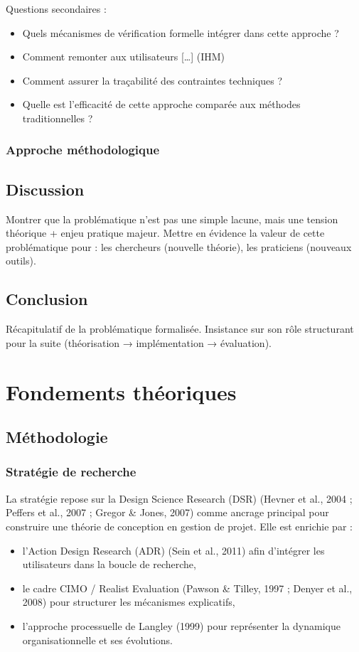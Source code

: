 \documentclass[a4paper,12pt]{article}
\begin{document}
Questions secondaires :
\begin{itemize}
\item Quels mécanismes de vérification formelle intégrer dans cette approche ?
\item Comment remonter aux utilisateurs [\ldots{}] (IHM)
\item Comment assurer la traçabilité des contraintes techniques ?
\item Quelle est l'efficacité de cette approche comparée aux méthodes traditionnelles ?
\end{itemize}
\subsubsection{Approche méthodologique}
\label{sec:org1551645}
\subsection{Discussion}
\label{sec:org03212c4}
Montrer que la problématique n’est pas une simple lacune, mais une tension théorique + enjeu pratique majeur.
Mettre en évidence la valeur de cette problématique pour :
les chercheurs (nouvelle théorie),
les praticiens (nouveaux outils).
\subsection{Conclusion}
\label{sec:org14a85c7}
Récapitulatif de la problématique formalisée.
Insistance sur son rôle structurant pour la suite (théorisation → implémentation → évaluation).
\clearpage
\section{Fondements théoriques}
\label{sec:org3c579f3}
\subsection{Méthodologie}
\label{sec:org51f4640}
\subsubsection{Stratégie de recherche}
\label{sec:org715d37f}
La stratégie repose sur la Design Science Research (DSR) (Hevner et al., 2004 ; Peffers et al., 2007 ; Gregor \& Jones, 2007) comme ancrage principal pour construire une théorie de conception en gestion de projet.
Elle est enrichie par :
\begin{itemize}
\item l’Action Design Research (ADR) (Sein et al., 2011) afin d’intégrer les utilisateurs dans la boucle de recherche,
\item le cadre CIMO / Realist Evaluation (Pawson \& Tilley, 1997 ; Denyer et al., 2008) pour structurer les mécanismes explicatifs,
\item l’approche processuelle de Langley (1999) pour représenter la dynamique organisationnelle et ses évolutions.
\end{itemize}
\end{document}
